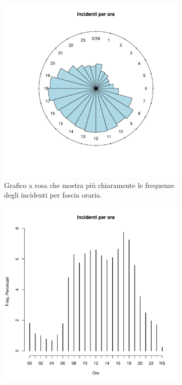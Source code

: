 \documentclass[12pt,a4paper,final,oneside]{article}			%
\begin{document}
        \begin{figure}[h]
        \centering
            \begin{subfigure}{.48\textwidth}
                \includegraphics[scale=0.5]{./../results/incidenti_per_ora_orologio.pdf}
                \caption{Grafico a rosa che mostra più chiaramente le frequenze degli incidenti per fascia oraria.}
                \label{Fig: incidenti_per_ora_orologio}
            \end{subfigure}
            \hfill
            \begin{subfigure}{.48\textwidth}
                \includegraphics[scale=0.5]{./../results/incidenti_per_ora.pdf}

\end{subfigure}
\end{figure}
\end{document}
